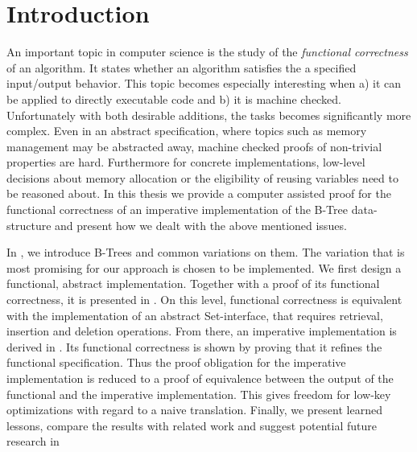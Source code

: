 

\chapter{Introduction}\label{chapter:introduction}

An important topic in computer science is the study of the
\textit{functional correctness} of an algorithm.
It states whether an algorithm satisfies the a specified
input/output behavior.
This topic becomes especially interesting when a) it can be applied
to directly executable code and b) it is machine checked.
Unfortunately with both desirable additions, the tasks becomes
significantly more complex.
Even in an abstract specification, where topics such as
memory management may be abstracted away,
machine checked proofs of non-trivial properties
are hard.
Furthermore for concrete implementations,
low-level decisions about memory allocation or
the eligibility of reusing variables need to be
reasoned about.
In this thesis we provide a computer assisted proof for the functional
correctness of an imperative implementation of the B-Tree data-structure
and present how we dealt with the above mentioned issues.

In , we introduce B-Trees and common variations
on them.
The variation that is most promising for our approach is chosen
to be implemented.
We first design a functional, abstract implementation.
Together with a proof of its functional correctness,
it is presented in .
On this level, functional correctness is equivalent with the
implementation of an abstract Set-interface,
that requires retrieval, insertion and deletion operations.
From there, an imperative implementation is derived in .
Its functional correctness is shown by proving that it refines the functional specification.
Thus the proof obligation for the imperative implementation
is reduced to a proof of equivalence between the output of the
functional and the imperative implementation.
This gives freedom for low-key optimizations with regard to a naive translation.
Finally, we present learned lessons, compare the results with related work and suggest potential future
research in 


